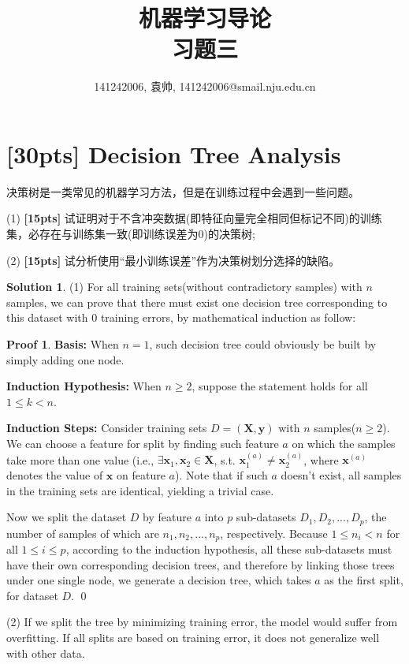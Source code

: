 \documentclass[a4paper,UTF8]{article}
\numberwithin{equation}{section}
\theoremstyle{definition}
\newtheorem*{solution}{Solution}
\newtheorem*{prove}{Proof}
\begin{document}
\title{机器学习导论\\
习题三}
\author{141242006, 袁帅, 141242006@smail.nju.edu.cn}
\maketitle
\section{[30pts] Decision Tree Analysis}
决策树是一类常见的机器学习方法，但是在训练过程中会遇到一些问题。

(1) \textbf{[15pts]} 试证明对于不含冲突数据(即特征向量完全相同但标记不同)的训练集，必存在与训练集一致(即训练误差为0)的决策树;

(2) \textbf{[15pts]} 试分析使用“最小训练误差”作为决策树划分选择的缺陷。
\begin{solution}
\item[(1)] For all training sets(without contradictory samples) with $n$ samples, we can prove that there must exist one decision tree corresponding to this dataset with 0 training errors, by mathematical induction as follow:
\begin{prove} 
\textbf{Basis:} When $n=1$, such decision tree could obviously be built by simply adding one node.

\textbf{Induction Hypothesis:} When $n\geq 2$, suppose the statement holds for all $1\leq k<n$.

\textbf{Induction Steps:} Consider training sets $D=(\bm{X}, \bm{y})$ with $n$ samples($n\geq 2$). We can choose a feature for split by finding such feature $a$ on which the samples take more than one value (i.e., $\exists \bm{x}_1, \bm{x}_2 \in \bm{X}$, s.t. $\bm{x}_1^{(a)}\neq\bm{x}_2^{(a)}$, where $\bm{x}^{(a)}$ denotes the value of $\bm{x}$ on feature $a$). Note that if such $a$ doesn't exist, all samples in the training sets are identical, yielding a trivial case.

Now we split the dataset $D$ by feature $a$ into $p$ sub-datasets $D_1, D_2, ..., D_p$, the number of samples of which are $n_1, n_2, ..., n_p$, respectively. Because $1\leq n_i<n$ for all $1\leq i\leq p$, according to the induction hypothesis, all these sub-datasets must have their own corresponding decision trees, and therefore by linking those trees under one single node, we generate a decision tree, which takes $a$ as the first split, for dataset $D$.
\qed
\end{prove}

\item[(2)] If we split the tree by minimizing training error, the model would suffer from overfitting. If all splits are based on training error, it does not generalize well with other data.

\end{solution}
\end{document}
